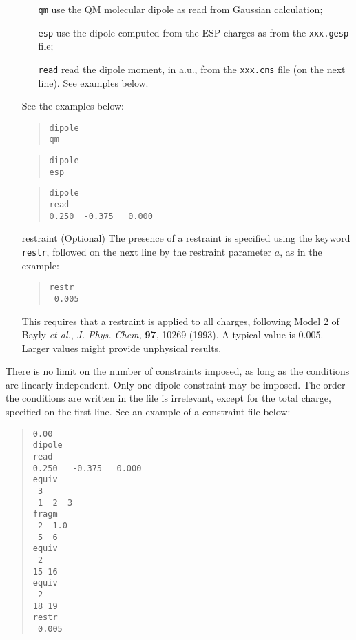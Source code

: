 \documentclass[a4paper]{report}
\begin{document}
\begin{itemize}
\begin{itemize}
\item[\texttt{qm}] use the QM molecular dipole as read from Gaussian calculation;
\item[\texttt{esp}] use the dipole computed from the ESP charges as from the \texttt{xxx.gesp} file; 
\item[\texttt{read}] read the dipole moment, in a.u., from the \texttt{xxx.cns} file (on the next line). See examples below.
\end{itemize}
See the examples below:
\begin{framed}
\begin{quote}
\begin{verbatim}
dipole 
qm
\end{verbatim}
\end{quote}
\end{framed}
\begin{framed}
\begin{quote}
\begin{verbatim}
dipole 
esp
\end{verbatim}
\end{quote}
\end{framed}
\begin{framed}
\begin{quote}
\begin{verbatim}
dipole 
read
0.250  -0.375   0.000
\end{verbatim}
\end{quote}
\end{framed}

\item[restraint] (Optional) The presence of a restraint is specified using the
keyword \texttt{restr}, followed on the next line by the restraint parameter $a$, as
in the example:
\begin{framed}
\begin{quote}
\begin{verbatim}
restr
 0.005
\end{verbatim}
\end{quote}
\end{framed}
This requires that a restraint is applied to all charges, following Model 2 of Bayly
\emph{et al.}, \emph{J. Phys. Chem,} \textbf{97}, 10269 (1993). A typical value is
0.005. Larger values might provide unphysical results.

\end{itemize}

There is no limit on the number of constraints imposed, as long as the conditions are
linearly independent. Only one dipole constraint may be imposed. The order the
conditions are written in the file is irrelevant, except for the total charge,
specified on the first line. See an example of a constraint file below:
\begin{framed}
\begin{quote}
\begin{verbatim}
0.00
dipole
read
0.250   -0.375   0.000
equiv
 3
 1  2  3
fragm
 2  1.0
 5  6
equiv
 2
15 16
equiv
 2
18 19
restr
 0.005
\end{verbatim}
\end{quote}
\end{framed}
\end{document}
